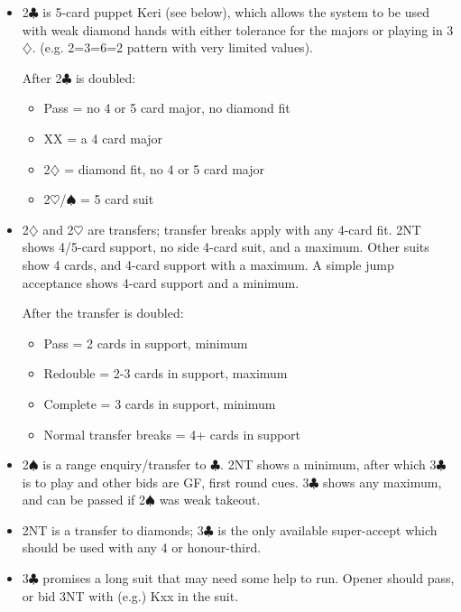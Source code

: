 \documentclass[a4paper,14pt]{extarticle}
\begin{document}
\begin{itemize}

\item 2$\clubsuit$ is 5-card puppet Keri (see below), which allows the system to be used with weak diamond hands with either tolerance for the majors or playing in 3$\diamondsuit$. (e.g. 2=3=6=2 pattern with very limited values).

\label{note:9}

After 2$\clubsuit$ is doubled:

	\begin{itemize}
	\item Pass = no 4 or 5 card major, no diamond fit
	\item XX = a 4 card major
	\item 2$\diamondsuit$ = diamond fit, no 4 or 5 card major
	\item 2$\heartsuit$/$\spadesuit$ = 5 card suit
	\end{itemize}

\item 2$\diamondsuit$ and 2$\heartsuit$ are transfers; transfer breaks apply with any 4-card fit.  2NT
shows 4/5-card support, no side 4-card suit, and a maximum.  Other suits
show 4 cards, and 4-card support with a maximum.  A simple jump acceptance
shows 4-card support and a minimum.

After the transfer is doubled:

	\begin{itemize}
	\item Pass = 2 cards in support, minimum
	\item Redouble = 2-3 cards in support, maximum
	\item Complete = 3 cards in support, minimum
	\item Normal transfer breaks = 4+ cards in support
	\end{itemize}

\item 2$\spadesuit$ is a range enquiry/transfer to $\clubsuit$.  2NT shows a
minimum, after which 3$\clubsuit$ is to play and other bids are GF, first round
cues.  3$\clubsuit$ shows any maximum, and can be passed if 2$\spadesuit$ was
weak takeout.

\item 2NT is a transfer to diamonds; 3$\clubsuit$ is the only available super-accept which 
should be used with any 4 or honour-third.

\item 3$\clubsuit$ promises a long suit that may need some help to run.  Opener should
pass, or bid 3NT with (e.g.) Kxx in the suit.


\end{itemize}
\end{document}
